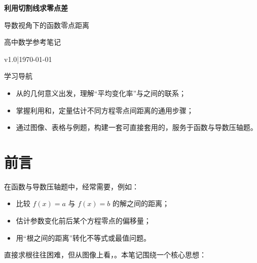 \documentclass[a4paper,11pt]{ctexart}
\renewcommand{\notetitle}{利用切割线求零点差}
\renewcommand{\noteauthor}{高中数学参考笔记}
\renewcommand{\notedate}{\today}
\renewcommand{\notesubtitle}{导数视角下的函数零点距离}
\renewcommand{\noteversion}{v1.0}
\begin{document}
\thispagestyle{empty}
\setcounter{page}{1}

\noindent
\begin{minipage}[t][0.7\textheight][c]{\textwidth}
  \raggedleft
  \vspace*{\fill}
  {\sffamily\bfseries\Huge\color{accent}\notetitle\par}
  \vspace{0.6em}
  {\Large\color{inkgray}\notesubtitle\par}
  \vspace{0.5em}
  {\large\color{inkgray}\noteauthor\par}
  \vspace{0.4em}
  {\normalsize\color{inkgray}\noteversion\quad|\quad\notedate\par}
  \vspace*{\fill}
\end{minipage}

\begin{center}
\begin{minipage}{0.84\textwidth}
  \textcolor{inkgray}{\sffamily\small 学习导航}\\
  \begin{itemize}
    \item 从的几何意义出发，理解“平均变化率”与之间的联系；
    \item 掌握利用和，定量估计不同方程零点间距离的通用步骤；
    \item 通过图像、表格与例题，构建一套可直接套用的，服务于函数与导数压轴题。
  \end{itemize}
\end{minipage}
\end{center}
\vspace{1em}

\clearpage
\thispagestyle{plain}

\tableofcontents
\newpage

\section*{前言}

在函数与导数压轴题中，经常需要，例如：
\begin{itemize}
  \item 比较 $f(x)=a$ 与 $f(x)=b$ 的解之间的距离；
  \item 估计参数变化前后某个方程零点的偏移量；
  \item 用“根之间的距离”转化不等式或最值问题。
\end{itemize}
直接求根往往困难，但从图像上看，。本笔记围绕一个核心思想：
\end{document}
